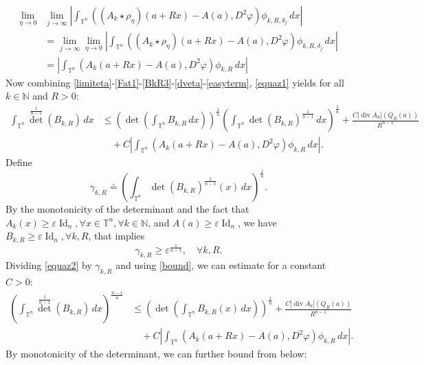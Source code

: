 \documentclass[10pt,reqno]{amsart}
\numberwithin{equation}{section}
\newcommand{\T}{\mathbb{T}}
\newcommand{\N}{\mathbb{N}}
\DeclareMathOperator{\Id}{Id}
\DeclareMathOperator{\dv}{div}
\theoremstyle{plain}
\theoremstyle{definition}
\theoremstyle{remark}
\begin{document}
\begin{equation}\label{easyterm}
\begin{split}
\lim_{\eta\to 0}&\lim_{j\to\infty}\left|\int_{\T^n}((A_k\star \rho_\eta)(a + Rx) -A(a),D^2\varphi) \phi_{k,R,\delta_j}\,dx\right| \\
&=\lim_{j\to \infty}\lim_{\eta\to 0} \left|\int_{\T^n}((A_k\star \rho_\eta)(a + Rx) -A(a),D^2\varphi) \phi_{k,R,\delta_j}\,dx\right| \\
&=\left|\int_{\T^n}(A_k(a + Rx) -A(a),D^2\varphi) \phi_{k,R}\,dx\right|
\end{split}
\end{equation}
Now combining \eqref{limiteta}-\eqref{Fat1}-\eqref{BkR3}-\eqref{dveta}-\eqref{easyterm}, \eqref{equaz1} yields for all $k \in \N$ and $R > 0$:
\begin{equation}\label{equaz2}
\begin{split}
\int_{\T^n}{\det}^\frac{1}{n-1}(B_{k,R})\,dx &\le \left(\det\left(\int_{\T^n}B_{k,R}\,dx\right)\right)^{\frac{1}{n}}\left(\int_{\T^n}\det(B_{k,R})^{\frac{1}{ n - 1}}\,dx\right)^{\frac{1}{n}}+\frac{C|\dv A_k|( Q_R(a))}{R^{n-1}}\\
& \quad +C\left|\int_{\T^n}(A_k(a + Rx) -A(a),D^2\varphi) \phi_{k,R}\,dx\right|.
\end{split}
\end{equation}
Define
\[
\gamma_{k,R} \doteq \left(\int_{\T^n}\det(B_{k,R})^{\frac{1}{ n - 1}}(x)\,dx\right)^{\frac{1}{n}}.
\]
By the monotonicity of the determinant and the fact that $A_k(x) \ge \varepsilon \Id_n,\forall x \in \T^n, \forall k \in \N$, and $A(a) \ge \varepsilon\Id_n$, we have $B_{k,R} \ge \varepsilon\Id_n, \forall k,R$, that implies
\begin{equation}\label{bound}
\gamma_{k,R} \ge  \varepsilon^{\frac{1}{n - 1}},\quad  \forall k,R.
\end{equation}
Dividing \eqref{equaz2} by $\gamma_{k,R}$ and using \eqref{bound}, we can estimate for a constant $C >0$:
\begin{equation*}
\begin{split}
\left(\int_{\T^n}{\det}^\frac{1}{n-1}(B_{k,R})\,dx\right)^\frac{n - 1}{n} &\le \left(\det\left(\int_{\T^n}B_{k,R}(x)\,dx\right)\right)^{\frac{1}{n}}+\frac{C|\dv A_k|( Q_R(a))}{R^{n-1}}\\
& \quad +C\left|\int_{\T^n}(A_k(a + Rx) -A(a),D^2\varphi) \phi_{k,R}\,dx\right|.
\end{split}
\end{equation*}
By monotonicity of the determinant, we can further bound from below:
\end{document}
